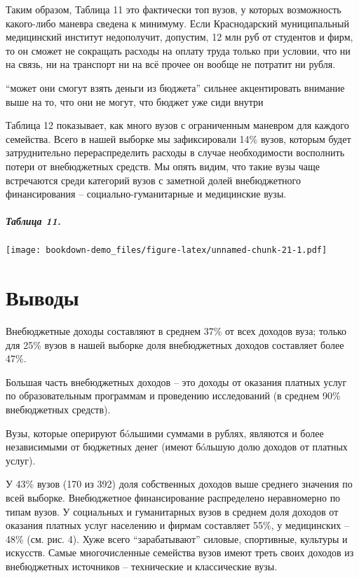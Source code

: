 \documentclass[]{book}
\let\oldparagraph\paragraph
\renewcommand{\paragraph}[1]{\oldparagraph{#1}\mbox{}}
\begin{document}
Таким образом, Таблица 11 это фактически топ вузов, у которых возможность какого-либо маневра сведена к минимуму. Если Краснодарский муниципальный медицинский институт недополучит, допустим, 12 млн руб от студентов и фирм, то он сможет не сокращать расходы на оплату труда только при условии, что ни на связь, ни на транспорт ни на всё прочее он вообще не потратит ни рубля.

``может они смогут взять деньги из бюджета'' сильнее акцентировать внимание выше на то, что они не могут, что бюджет уже сиди внутри

Таблица 12 показывает, как много вузов с ограниченным маневром для каждого семейства. Всего в нашей выборке мы зафиксировали 14\% вузов, которым будет затруднительно перераспределить расходы в случае необходимости восполнить потери от внебюджетных средств. Мы опять видим, что такие вузы чаще встречаются среди категорий вузов с заметной долей внебюджетного финансирования -- социально-гуманитарные и медицинские вузы.

\hypertarget{ux442ux430ux431ux43bux438ux446ux430-11.}{%
\paragraph{Таблица 11.}\label{ux442ux430ux431ux43bux438ux446ux430-11.}}

\texttt{[image: bookdown-demo\_files/figure-latex/unnamed-chunk-21-1.pdf]}

\hypertarget{ux432ux44bux432ux43eux434ux44b}{%
\chapter{Выводы}\label{ux432ux44bux432ux43eux434ux44b}}

Внебюджетные доходы составляют в среднем 37\% от всех доходов вуза; только для 25\% вузов в нашей выборке доля внебюджетных доходов составляет более 47\%.

Большая часть внебюджетных доходов -- это доходы от оказания платных услуг по образовательным программам и проведению исследований (в среднем 90\% внебюджетных средств).

Вузы, которые оперируют бóльшими суммами в рублях, являются и более независимыми от бюджетных денег (имеют бóльшую долю доходов от платных услуг).

У 43\% вузов (170 из 392) доля собственных доходов выше среднего значения по всей выборке.
Внебюджетное финансирование распределено неравномерно по типам вузов. У социальных и гуманитарных вузов в среднем доля доходов от оказания платных услуг населению и фирмам составляет 55\%, у медицинских -- 48\% (см. рис. 4). Хуже всего ``зарабатывают'' силовые, спортивные, культуры и искусств. Самые многочисленные семейства вузов имеют треть своих доходов из внебюджетных источников -- технические и классические вузы.
\end{document}
